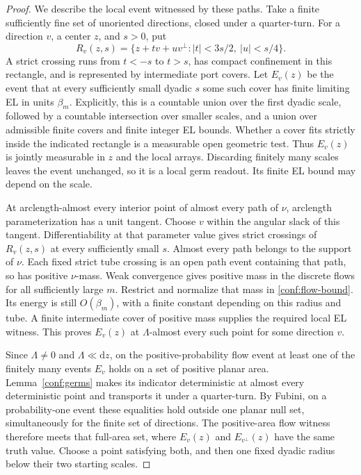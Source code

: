 \documentclass[11pt]{article}
\numberwithin{equation}{section}
\theoremstyle{definition}
\theoremstyle{remark}
\newcommand{\1}{\mathbf 1}
\begin{document}
\begin{proof}
We describe the local event witnessed by these paths.  Take a finite
sufficiently fine set of unoriented directions, closed under a
quarter-turn.  For a direction \(v\), a center \(z\), and
\(s>0\), put
\[
 R_v(z,s)=\{z+t v+u v^\perp: |t|<3s/2,\ |u|<s/4\}.
\]
A strict crossing runs from \(t<-s\) to \(t>s\), has compact
confinement in this rectangle, and is represented by intermediate
port covers.  Let \(E_v(z)\) be the event that at every sufficiently
small dyadic \(s\) some such cover has finite limiting EL in units
\(\beta_m\).  Explicitly, this is a countable union over the first
dyadic scale, followed by a countable intersection over smaller
scales, and a union over admissible finite covers and finite integer
EL bounds.  Whether a cover fits strictly inside the indicated
rectangle is a measurable open geometric test.  Thus \(E_v(z)\)
is jointly measurable in \(z\) and the local arrays.  Discarding
finitely many scales leaves the event unchanged, so it is a local
germ readout.  Its finite EL bound may depend on the scale.

At arclength-almost every interior point of almost every path of
\(\nu\), arclength parameterization has a unit tangent.  Choose
\(v\) within the angular slack of this tangent.  Differentiability
at that parameter value gives strict crossings of \(R_v(z,s)\)
at every sufficiently small \(s\).  Almost every path belongs to
the support of \(\nu\).  Each fixed strict tube crossing is an
open path event containing that path, so has positive \(\nu\)-mass.
Weak convergence gives positive mass in the discrete flows for all
sufficiently large \(m\).  Restrict and normalize that mass in
\eqref{conf:flow-bound}.  Its energy is still \(O(\beta_m)\), with
a finite constant depending on this radius and tube.  A finite
intermediate cover of positive mass supplies the required local EL
witness.  This proves \(E_v(z)\) at \(\Lambda\)-almost every
such point for some direction \(v\).

Since \(\Lambda\ne0\) and \(\Lambda\ll\mathrm d z\), on the
positive-probability flow event at least one of the finitely many
events \(E_v\) holds on a set of positive planar area.
Lemma~\ref{conf:germs} makes its indicator deterministic at almost
every deterministic point and transports it under a quarter-turn.
By Fubini, on a probability-one event these equalities hold outside
one planar null set, simultaneously for the finite set of directions.
The positive-area flow witness therefore meets that full-area set,
where \(E_v(z)\) and \(E_{v^\perp}(z)\) have the same truth
value.  Choose a point satisfying both, and then one fixed dyadic
radius below their two starting scales.


\end{proof}
\end{document}
